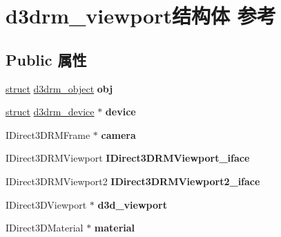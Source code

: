 \hypertarget{structd3drm__viewport}{}\section{d3drm\+\_\+viewport结构体 参考}
\label{structd3drm__viewport}
\subsection*{Public 属性}
\begin{DoxyCompactItemize}
\item 
\mbox{\label{structd3drm__viewport_a41354155dac02c388abb86124a899eb9}} 
\hyperlink{interfacestruct}{struct} \hyperlink{structd3drm__object}{d3drm\+\_\+object} {\bfseries obj}
\item 
\mbox{\label{structd3drm__viewport_a2dbcc7ab7dbfb95e8a14a12d6a1cda71}} 
\hyperlink{interfacestruct}{struct} \hyperlink{structd3drm__device}{d3drm\+\_\+device} $\ast$ {\bfseries device}
\item 
\mbox{\label{structd3drm__viewport_a8ad7b30b3010d10fcbba07493e5c1292}} 
I\+Direct3\+D\+R\+M\+Frame $\ast$ {\bfseries camera}
\item 
\mbox{\label{structd3drm__viewport_a1df760c74b23efa900a1c370b7246521}} 
I\+Direct3\+D\+R\+M\+Viewport {\bfseries I\+Direct3\+D\+R\+M\+Viewport\+\_\+iface}
\item 
\mbox{\label{structd3drm__viewport_a6c702079136b52955d8b375edf3852d1}} 
I\+Direct3\+D\+R\+M\+Viewport2 {\bfseries I\+Direct3\+D\+R\+M\+Viewport2\+\_\+iface}
\item 
\mbox{\label{structd3drm__viewport_a95048fb7dfa748eaabd29251e60673ec}} 
I\+Direct3\+D\+Viewport $\ast$ {\bfseries d3d\+\_\+viewport}
\item 
\mbox{\label{structd3drm__viewport_aa62815a86d70946bdf4bfd6b20ff560e}} 
I\+Direct3\+D\+Material $\ast$ {\bfseries material}
\item 
\mbox{\label{structd3drm__viewport_aa8366372ffb5ab9e701a72726c42be4d}} 

\end{DoxyCompactItemize}
